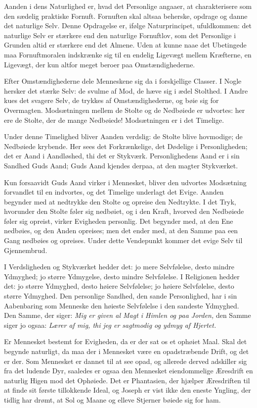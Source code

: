 \documentclass[12pt,a4paper]{book}
\newcommand{\apage}[1]{\marginnote{\footnotesize\textit{[#1]}}}
\begin{document}
Aanden i dens Naturlighed er, hvad det Personlige angaaer, at
charakterisere som den sædelig praktiske Fornuft. Fornuften skal altsaa
beherske, opdrage og danne det naturlige Selv. Denne Opdragelse er,
ifølge Naturprincipet, ufuldkommen: det naturlige Selv er stærkere end
den naturlige Fornuftlov, som det Personlige i Grunden altid er stærkere
end det Almene. Uden at kunne naae det Ubetingede maa Fornuftmoralen
indskrænke sig til en endelig Ligevægt mellem Kræfterne, en Ligevægt,
der kun altfor meget beroer paa Omstændighederne.

Efter Omstændighederne dele Menneskene sig da i forskjellige Classer. I
Nogle hersker det stærke Selv: de svulme af Mod, de hæve sig i ædel
Stolthed. I Andre kues det svagere Selv, de trykkes af Omstændighederne,
og bøie sig for Overmagten. Modsætningen mellem de Stolte og de
Nedbøiede er udvortes: her ere de Stolte, der de mange Nedbøiede!
Modsætningen er i det Timelige.

Under denne Timelighed bliver Aanden verdslig: de Stolte blive
hovmodige; de Nedbøiede krybende. Her sees det Forkrænkelige, det
Dødelige i Personligheden; det er Aand i Aandløshed, thi det er
Stykværk. Personlighedens Aand er i sin Sandhed Guds Aand; Guds Aand
kjendes derpaa, at den magter Stykværket.

Kun forsaavidt Guds Aand virker i Mennesket, bliver den udvortes
Modsætning forvandlet til en indvortes, og det Timelige underlagt det
Evige. Aanden begynder med at nedtrykke den Stolte og opreise den
Nedtrykte. I det Tryk,
hvorunder den Stolte føler sig nedbøiet, og i den Kraft, hvorved \apage{39} den
Nedbøiede føler sig opreist, virker Evigheden personlig. Det begynder
med, at den Ene nedbøies, og den Anden opreises; men det ender med, at
den Samme paa een Gang nedbøies og opreises. Under dette Vendepunkt
kommer det evige Selv til Gjennembrud.

I Verdsligheden og Stykværket hedder det: jo mere Selvfølelse, desto
mindre Ydmyghed; jo større Ydmygelse, desto mindre Selvfølelse. I
Religionen hedder det: jo større Ydmyghed, desto høiere Selvfølelse; jo
høiere Selvfølelse, desto større Ydmyghed. Den personlige Sandhed, den
sande Personlighed, har i sin Aabenbaring som Menneske den høieste
Selvfølelse i den sandeste Ydmyghed. Den Samme, der siger: \emph{Mig er
given al Magt i Himlen og paa Jorden,} den Samme siger jo ogsaa:
\emph{Lærer af mig, thi jeg er sagtmodig og ydmyg af Hjertet.}

Er Mennesket bestemt for Evigheden, da er der sat os et ophøiet Maal.
Skal det begynde naturligt, da maa der i Mennesket være en
opadstræbende Drift, og det er der. Som Mennesket er dannet til at see
opad, og allerede derved adskiller sig fra det ludende Dyr, saaledes er
ogsaa den Mennesket eiendommelige Æresdrift en naturlig Higen mod det
Ophøiede. Det er Phantasien, der hjælper Æresdriften til at finde sit
første tillokkende Ideal, og Joseph er vist ikke den eneste Yngling,
der tidlig har drømt, at Sol og Maane og elleve Stjerner bøiede sig for
ham.
\end{document}
